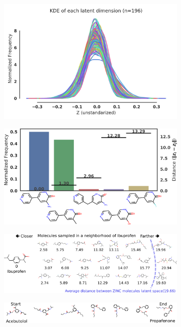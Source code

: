 \begin{figure}
    \centering
	\begin{subfigure}{0.45\textwidth}
       \includegraphics[width=\textwidth]{fig2a_dims_unstandard_Z.png}
    \end{subfigure}
    \vspace{1em}
	\begin{subfigure}{0.45\textwidth}
       \includegraphics[width=\textwidth]{fig2b_Ibandronate_hist_BIG.png} 
    \end{subfigure}
	\begin{subfigure}{\textwidth}
	    \includegraphics[width=\textwidth]{fig2c_Ibuprofen_local.png} 
    \end{subfigure}
	\begin{subfigure}{\textwidth}
	    \includegraphics[width=\textwidth]{fig2d_interp_nice.png}	
    \end{subfigure}


\end{figure}
